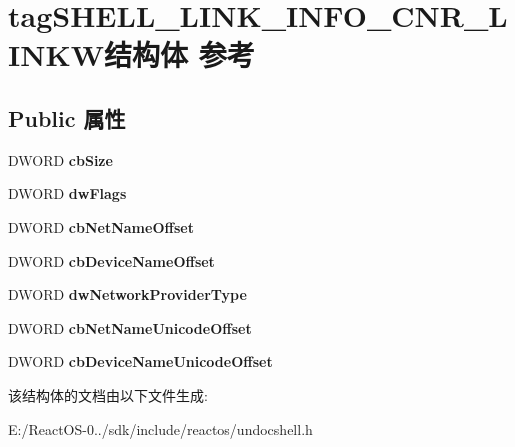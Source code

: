 \hypertarget{structtag_s_h_e_l_l___l_i_n_k___i_n_f_o___c_n_r___l_i_n_k_w}{}\section{tag\+S\+H\+E\+L\+L\+\_\+\+L\+I\+N\+K\+\_\+\+I\+N\+F\+O\+\_\+\+C\+N\+R\+\_\+\+L\+I\+N\+K\+W结构体 参考}
\label{structtag_s_h_e_l_l___l_i_n_k___i_n_f_o___c_n_r___l_i_n_k_w}
\subsection*{Public 属性}
\begin{DoxyCompactItemize}
\item 
\mbox{\label{structtag_s_h_e_l_l___l_i_n_k___i_n_f_o___c_n_r___l_i_n_k_w_ad04be7da65847e3b4e30c7293c2cb0cd}} 
D\+W\+O\+RD {\bfseries cb\+Size}
\item 
\mbox{\label{structtag_s_h_e_l_l___l_i_n_k___i_n_f_o___c_n_r___l_i_n_k_w_a8183eea6cf3df5f2b6234017645aa9ba}} 
D\+W\+O\+RD {\bfseries dw\+Flags}
\item 
\mbox{\label{structtag_s_h_e_l_l___l_i_n_k___i_n_f_o___c_n_r___l_i_n_k_w_a4092463b31fcd9d060c537a74dbf9ec6}} 
D\+W\+O\+RD {\bfseries cb\+Net\+Name\+Offset}
\item 
\mbox{\label{structtag_s_h_e_l_l___l_i_n_k___i_n_f_o___c_n_r___l_i_n_k_w_a5c08294b387c1b8646d43edf9e0f49a7}} 
D\+W\+O\+RD {\bfseries cb\+Device\+Name\+Offset}
\item 
\mbox{\label{structtag_s_h_e_l_l___l_i_n_k___i_n_f_o___c_n_r___l_i_n_k_w_a6f6db7116aeacdf4e54da8aba32cf0f1}} 
D\+W\+O\+RD {\bfseries dw\+Network\+Provider\+Type}
\item 
\mbox{\label{structtag_s_h_e_l_l___l_i_n_k___i_n_f_o___c_n_r___l_i_n_k_w_a366f061defaa4861ea3c5095c48b8e79}} 
D\+W\+O\+RD {\bfseries cb\+Net\+Name\+Unicode\+Offset}
\item 
\mbox{\label{structtag_s_h_e_l_l___l_i_n_k___i_n_f_o___c_n_r___l_i_n_k_w_ac71b9361fd509f39c2f250ac3bc1a30a}} 
D\+W\+O\+RD {\bfseries cb\+Device\+Name\+Unicode\+Offset}
\end{DoxyCompactItemize}


该结构体的文档由以下文件生成\+:\begin{DoxyCompactItemize}
\item 
E\+:/\+React\+O\+S-\/0../sdk/include/reactos/undocshell.\+h\end{DoxyCompactItemize}

